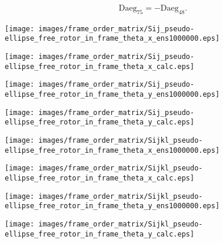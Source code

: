 \documentclass[a4paper,11pt,twoside,openright]{book}
\def\lthtmlcheckvsize{\ifdim\ht\sizebox<\vsize 
  \ifdim\wd\sizebox<\hsize\expandafter\hfill\fi \expandafter\vfill
  \else\expandafter\vss\fi}%
\begin{document}
{\newpage\clearpage
\setcounter{equation}{58}
%
\begin{subequations}\begin{flalign}
&\textrm{Daeg}_{75} = -\textrm{Daeg}_{48} . &
\end{flalign}\end{subequations}%
\lthtmldisplayZ
\lthtmlcheckvsize\clearpage}

{\newpage\clearpage
{}%
\texttt{[image: images/frame\_order\_matrix/Sij\_pseudo-ellipse\_free\_rotor\_in\_frame\_theta\_x\_ens1000000.eps]}%
\lthtmlpictureZ
\lthtmlcheckvsize\clearpage}

{\newpage\clearpage
{}%
\texttt{[image: images/frame\_order\_matrix/Sij\_pseudo-ellipse\_free\_rotor\_in\_frame\_theta\_x\_calc.eps]}%
\lthtmlpictureZ
\lthtmlcheckvsize\clearpage}

{\newpage\clearpage
{}%
\texttt{[image: images/frame\_order\_matrix/Sij\_pseudo-ellipse\_free\_rotor\_in\_frame\_theta\_y\_ens1000000.eps]}%
\lthtmlpictureZ
\lthtmlcheckvsize\clearpage}

{\newpage\clearpage
{}%
\texttt{[image: images/frame\_order\_matrix/Sij\_pseudo-ellipse\_free\_rotor\_in\_frame\_theta\_y\_calc.eps]}%
\lthtmlpictureZ
\lthtmlcheckvsize\clearpage}

{\newpage\clearpage
{}%
\texttt{[image: images/frame\_order\_matrix/Sijkl\_pseudo-ellipse\_free\_rotor\_in\_frame\_theta\_x\_ens1000000.eps]}%
\lthtmlpictureZ
\lthtmlcheckvsize\clearpage}

{\newpage\clearpage
{}%
\texttt{[image: images/frame\_order\_matrix/Sijkl\_pseudo-ellipse\_free\_rotor\_in\_frame\_theta\_x\_calc.eps]}%
\lthtmlpictureZ
\lthtmlcheckvsize\clearpage}

{\newpage\clearpage
{}%
\texttt{[image: images/frame\_order\_matrix/Sijkl\_pseudo-ellipse\_free\_rotor\_in\_frame\_theta\_y\_ens1000000.eps]}%
\lthtmlpictureZ
\lthtmlcheckvsize\clearpage}

{\newpage\clearpage
{}%
\texttt{[image: images/frame\_order\_matrix/Sijkl\_pseudo-ellipse\_free\_rotor\_in\_frame\_theta\_y\_calc.eps]}%
\lthtmlpictureZ
\lthtmlcheckvsize\clearpage}
\end{document}
